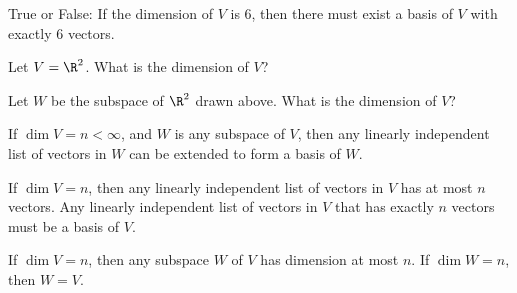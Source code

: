 \edXsolution{
}

\endedxproblem




True or False: If the dimension of $V$ is 6, then there must exist a basis of $V$ with exactly 6 vectors.


\edXsolution{
}

\endedxproblem


Let $V = \R^2$.  What is the dimension of $V$?  


\edXsolution{
}

\endedxproblem




\begin{center}

\end{center}

Let $W$ be the subspace of $\R^2$ drawn above.  What is the dimension of $V$?  



\edXsolution{
}

\endedxproblem


\endedxvertical










{}  If $\dim V = n < \infty$, and $W$ is any subspace of $V$, then any
linearly independent list of vectors in $W$ can be extended to form a basis of $W$.  

{} If $\dim V = n$, then any linearly independent list of vectors in $V$ has
at most $n$ vectors.  Any linearly independent list of vectors in $V$ that has exactly $n$ vectors must
be a basis of $V$.  


{} If $\dim V = n$, then any subspace $W$ of $V$ has dimension at most $n$.  
If $\dim W = n$, then $W = V$.  


